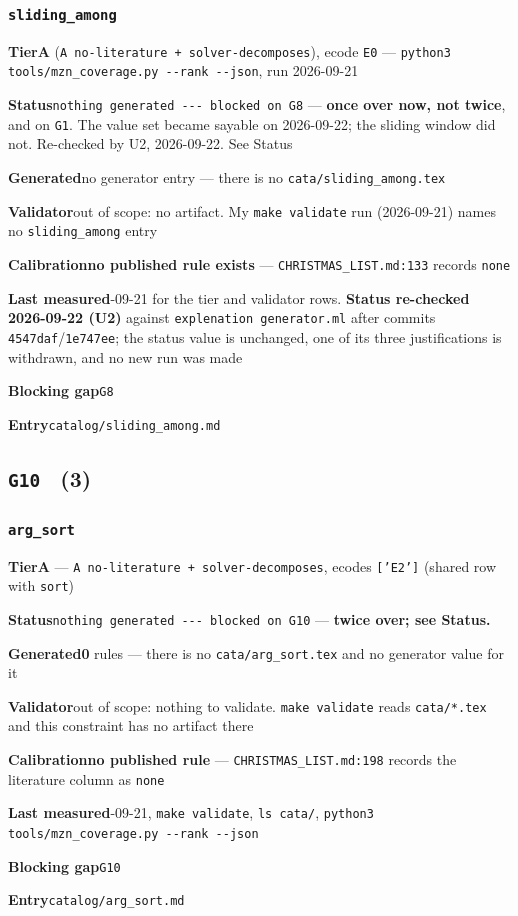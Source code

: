 \documentclass[10pt,a4paper]{article}
\newcommand{\entryfield}[2]{{\raggedright\textbf{#1}\quad #2\par}}
\begin{document}
\subsubsection*{\texttt{sliding\_\allowbreak{}among}}
\label{entry:sliding-among}
\entryfield{Tier}{\textbf{A} (\texttt{A no-\allowbreak{}literature + solver-\allowbreak{}decomposes}), ecode \texttt{E0} --- \texttt{python3 tools/\allowbreak{}mzn\_\allowbreak{}coverage.\allowbreak{}py -\allowbreak{}-\allowbreak{}rank -\allowbreak{}-\allowbreak{}json}, run 2026-09-21}
\entryfield{Status}{\texttt{nothing generated -\allowbreak{}-\allowbreak{}-\allowbreak{} blocked on G8} --- \textbf{once over now, not twice}, and on \texttt{G1}. The value set became sayable on 2026-09-22; the sliding window did not. Re-checked by U2, 2026-09-22. See Status}
\entryfield{Generated}{no generator entry --- there is no \texttt{cata/sliding\_among.tex}}
\entryfield{Validator}{out of scope: no artifact. My \texttt{make validate} run (2026-09-21) names no \texttt{sliding\_among} entry}
\entryfield{Calibration}{\textbf{no published rule exists} --- \texttt{CHRISTMAS\_LIST.md:133} records \texttt{none}}
\entryfield{Last measured}{2026-09-21 for the tier and validator rows. \textbf{Status re-checked 2026-09-22 (U2)} against \texttt{explenation generator.ml} after commits \texttt{4547daf}/\texttt{1e747ee}; the status value is unchanged, one of its three justifications is withdrawn, and no new run was made}
\entryfield{Blocking gap}{\texttt{G8}}
\entryfield{Entry}{\texttt{catalog/sliding\_among.md}}
\subsection*{\texttt{G10} \ \normalsize(3)}
\subsubsection*{\texttt{arg\_\allowbreak{}sort}}
\label{entry:arg-sort}
\entryfield{Tier}{\textbf{A} --- \texttt{A no-\allowbreak{}literature + solver-\allowbreak{}decomposes}, ecodes \texttt{['E2']} (shared row with \texttt{sort})}
\entryfield{Status}{\texttt{nothing generated -\allowbreak{}-\allowbreak{}-\allowbreak{} blocked on G10} --- \textbf{twice over; see Status.}}
\entryfield{Generated}{\textbf{0} rules --- there is no \texttt{cata/arg\_sort.tex} and no generator value for it}
\entryfield{Validator}{out of scope: nothing to validate. \texttt{make validate} reads \texttt{cata/*.tex} and this constraint has no artifact there}
\entryfield{Calibration}{\textbf{no published rule} --- \texttt{CHRISTMAS\_LIST.md:198} records the literature column as \texttt{none}}
\entryfield{Last measured}{2026-09-21, \texttt{make validate}, \texttt{ls cata/}, \texttt{python3 tools/\allowbreak{}mzn\_\allowbreak{}coverage.\allowbreak{}py -\allowbreak{}-\allowbreak{}rank -\allowbreak{}-\allowbreak{}json}}
\entryfield{Blocking gap}{\texttt{G10}}
\entryfield{Entry}{\texttt{catalog/arg\_sort.md}}
\end{document}
